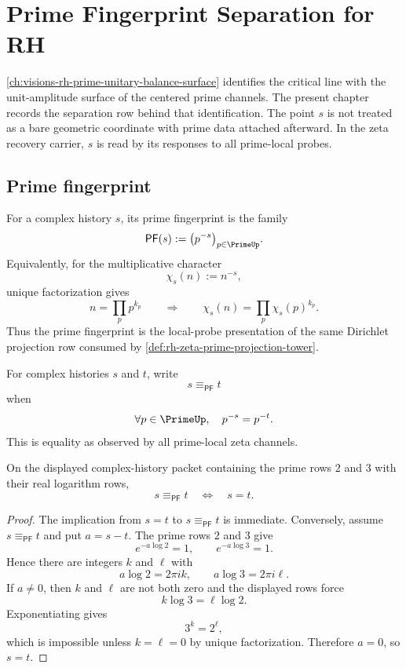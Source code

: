 \chapter{Prime Fingerprint Separation for RH}
\label{ch:visions-rh-prime-fingerprint-separation}

\autoref{ch:visions-rh-prime-unitary-balance-surface} identifies the
critical line with the unit-amplitude surface of the centered prime channels.
The present chapter records the separation row behind that identification.
The point $s$ is not treated as a bare geometric coordinate with prime data
attached afterward.  In the zeta recovery carrier, $s$ is read by its
responses to all prime-local probes.

\section{Prime fingerprint}
\label{sec:rh-prime-fingerprint}

\begin{definition}
\label{def:rh-prime-fingerprint}
For a complex history $s$, its prime fingerprint is the family
$$
\mathsf{PF}(s)
:=
\bigl(p^{-s}\bigr)_{p\in\PrimeUp}.
$$
Equivalently, for the multiplicative character
$$
\chi_s(n):=n^{-s},
$$
unique factorization gives
$$
n=\prod_p p^{k_p}
\qquad\Longrightarrow\qquad
\chi_s(n)=\prod_p \chi_s(p)^{k_p}.
$$
Thus the prime fingerprint is the local-probe presentation of the same
Dirichlet projection row consumed by
\autoref{def:rh-zeta-prime-projection-tower}.
\end{definition}

\begin{definition}
\label{def:rh-prime-fingerprint-equivalence}
For complex histories $s$ and $t$, write
$$
s\equiv_{\mathsf{PF}}t
$$
when
$$
\forall p\in\PrimeUp,\quad p^{-s}=p^{-t}.
$$
This is equality as observed by all prime-local zeta channels.
\end{definition}

\begin{proposition}
\label{prop:rh-prime-fingerprint-separates-points}
On the displayed complex-history packet containing the prime rows $2$ and
$3$ with their real logarithm rows,
$$
s\equiv_{\mathsf{PF}}t
\quad\Longleftrightarrow\quad
s=t.
$$
\end{proposition}

\begin{proof}
The implication from $s=t$ to $s\equiv_{\mathsf{PF}}t$ is immediate.
Conversely, assume $s\equiv_{\mathsf{PF}}t$ and put $a=s-t$.  The prime rows
$2$ and $3$ give
$$
e^{-a\log 2}=1,
\qquad
e^{-a\log 3}=1.
$$
Hence there are integers $k$ and $\ell$ with
$$
a\log 2=2\pi i k,
\qquad
a\log 3=2\pi i\ell.
$$
If $a\neq0$, then $k$ and $\ell$ are not both zero and the displayed rows
force
$$
k\log 3=\ell\log 2.
$$
Exponentiating gives
$$
3^k=2^\ell,
$$
which is impossible unless $k=\ell=0$ by unique factorization.  Therefore
$a=0$, so $s=t$.
\end{proof}

